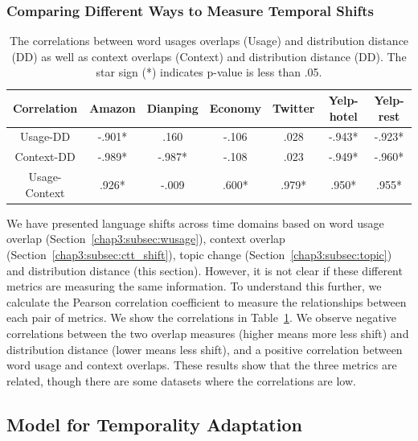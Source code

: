 \subsubsection{Comparing Different Ways to Measure Temporal Shifts}

\begin{table}[ht]
\centering
\begin{tabular}{c||cccccc}
Correlation & Amazon  & Dianping & Economy & Twitter & Yelp-hotel & Yelp-rest \\\hline\hline
Usage-DD    & -.901* & .160    & -.106  & .028   & -.943*    & -.923*   \\
Context-DD  & -.989* & -.987*   & -.108  & .023   & -.949*    & -.960*  \\
Usage-Context  & .926* & -.009   & .600*  & .979*   & .950*    & .955*  
\end{tabular}
\caption{The correlations between word usages overlaps (Usage) and distribution distance (DD) as well as context overlaps (Context) and distribution distance (DD). The star sign (*) indicates p-value is less than .05.}
\label{chap3:tab:corr}
\end{table}

We have presented language shifts across time domains based on word usage overlap (Section~\ref{chap3:subsec:wusage}), context overlap (Section~\ref{chap3:subsec:ctt_shift}), topic change (Section~\ref{chap3:subsec:topic}) and distribution distance (this section). However, it is not clear if these different metrics are measuring the same information. To understand this further, we calculate the Pearson correlation coefficient to measure the relationships between each pair of metrics. 
We show the correlations in Table~\ref{chap3:tab:corr}. We observe negative correlations between the two overlap measures (higher means more less shift) and distribution distance (lower means less shift),
and a positive correlation between word usage and context overlaps.
These results show that the three metrics are related, though there are some datasets where the correlations are low.


\subsection{Model for Temporality Adaptation}
\label{chap3:sec:model}

